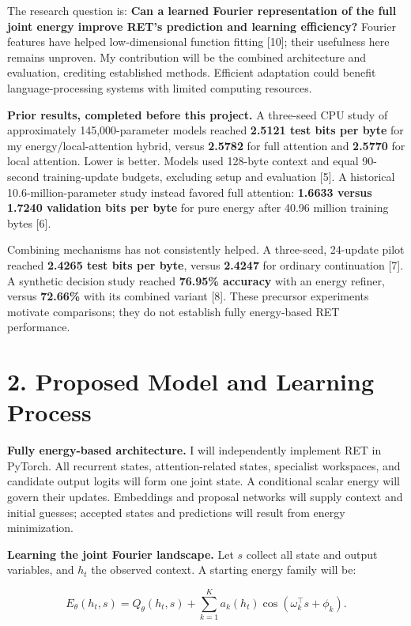 \documentclass[11pt,letterpaper]{article}
\begin{document}
The research question is: \textbf{Can a learned Fourier representation of the full joint energy improve RET's prediction and learning efficiency?} Fourier features have helped low-dimensional function fitting [10]; their usefulness here remains unproven. My contribution will be the combined architecture and evaluation, crediting established methods. Efficient adaptation could benefit language-processing systems with limited computing resources.

\textbf{Prior results, completed before this project.} A three-seed CPU study of approximately 145,000-parameter models reached \textbf{2.5121 test bits per byte} for my energy/local-attention hybrid, versus \textbf{2.5782} for full attention and \textbf{2.5770} for local attention. Lower is better. Models used 128-byte context and equal 90-second training-update budgets, excluding setup and evaluation [5]. A historical 10.6-million-parameter study instead favored full attention: \textbf{1.6633 versus 1.7240 validation bits per byte} for pure energy after 40.96 million training bytes [6].

Combining mechanisms has not consistently helped. A three-seed, 24-update pilot reached \textbf{2.4265 test bits per byte}, versus \textbf{2.4247} for ordinary continuation [7]. A synthetic decision study reached \textbf{76.95\% accuracy} with an energy refiner, versus \textbf{72.66\%} with its combined variant [8]. These precursor experiments motivate comparisons; they do not establish fully energy-based RET performance.

\newpage
\section*{2. Proposed Model and Learning Process}

\textbf{Fully energy-based architecture.} I will independently implement RET in PyTorch. All recurrent states, attention-related states, specialist workspaces, and candidate output logits will form one joint state. A conditional scalar energy will govern their updates. Embeddings and proposal networks will supply context and initial guesses; accepted states and predictions will result from energy minimization.

\textbf{Learning the joint Fourier landscape.} Let \(s\) collect all state and output variables, and \(h_t\) the observed context. A starting energy family will be:

\[
E_\theta(h_t,s)=Q_\theta(h_t,s)+\sum_{k=1}^{K}a_k(h_t)\cos(\omega_k^\top s+\phi_k).
\]
\end{document}
